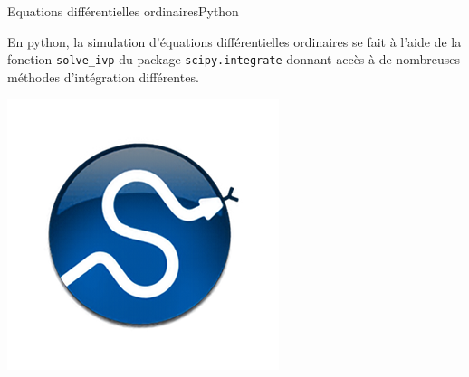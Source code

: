 \documentclass[usenames,dvipsnames,svgnames,10pt,aspectratio=169]{beamer}
\begin{document}
\begin{frame}[t, c, fragile]{Equations différentielles ordinaires}{Python}
  \begin{minipage}{.68\textwidth}
    En python, la simulation d'équations différentielles ordinaires se fait à l'aide de la fonction \verb+solve_ivp+ du package \verb+scipy.integrate+ donnant accès à de nombreuses méthodes d'intégration différentes.
  \end{minipage}%
  \hfill
  \begin{minipage}{.28\textwidth}
    \centering
    \includegraphics[width=\textwidth]{scipy_logo}
  \end{minipage}
\end{frame}
\end{document}

